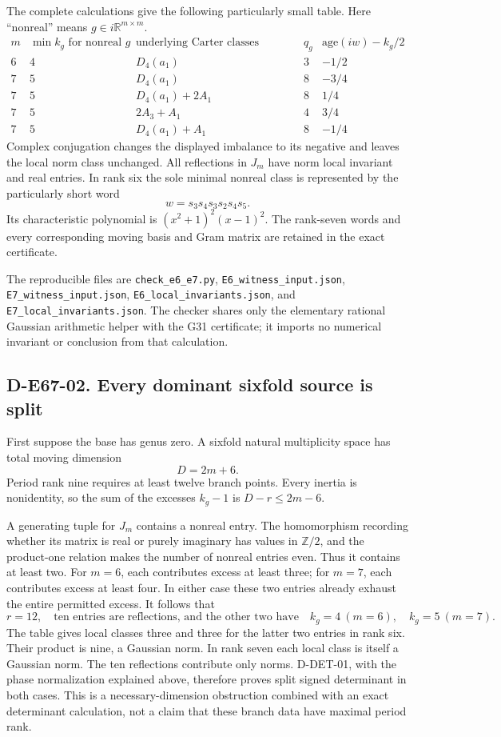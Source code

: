 The complete calculations give the following particularly small table.
Here ``nonreal'' means \(g\in i\mathbb R^{m\times m}\).
\[
\begin{array}{c|c|c|c|c}
m&\min k_g\text{ for nonreal }g&
 \text{underlying Carter classes attaining it}&q_g&
 \text{age}(iw)-k_g/2\\\hline
6&4&D_4(a_1)&3&-1/2\\
7&5&D_4(a_1)&8&-3/4\\
7&5&D_4(a_1)+2A_1&8&1/4\\
7&5&2A_3+A_1&4&3/4\\
7&5&D_4(a_1)+A_1&8&-1/4
\end{array}
\]
Complex conjugation changes the displayed imbalance to its negative
and leaves the local norm class unchanged. All reflections in \(J_m\)
have norm local invariant and real entries. In rank six the sole
minimal nonreal class is represented by the particularly short word
\[
                  w=s_3s_4s_3s_2s_4s_5.
\]
Its characteristic polynomial is \((x^2+1)^2(x-1)^2\).
The rank-seven words and every corresponding moving basis and Gram
matrix are retained in the exact certificate.

The reproducible files are \texttt{check\_e6\_e7.py},
\texttt{E6\_witness\_input.json}, \texttt{E7\_witness\_input.json},
\texttt{E6\_local\_invariants.json}, and
\texttt{E7\_local\_invariants.json}. The checker shares only the
elementary rational Gaussian arithmetic helper with the G31 certificate;
it imports no numerical invariant or conclusion from that calculation.

\subsection*{D-E67-02. Every dominant sixfold source is split}

First suppose the base has genus zero. A sixfold natural multiplicity
space has total moving dimension
\[
                              D=2m+6.
\]
Period rank nine requires at least twelve branch points. Every inertia
is nonidentity, so the sum of the excesses \(k_g-1\) is
\(D-r\le2m-6\).

A generating tuple for \(J_m\) contains a nonreal entry. The
homomorphism recording whether its matrix is real or purely imaginary
has values in \(\mathbb Z/2\), and the product-one relation makes
the number of nonreal entries even. Thus it contains at least two.
For \(m=6\), each contributes excess at least three; for \(m=7\),
each contributes excess at least four. In either case these two entries
already exhaust the entire permitted excess. It follows that
\[
 r=12,\quad\text{ten entries are reflections, and the other two have}
 \quad k_g=4\ (m=6),\quad k_g=5\ (m=7).
\]
The table gives local classes three and three for the latter two entries
in rank six. Their product is nine, a Gaussian norm. In rank seven each
local class is itself a Gaussian norm. The ten reflections contribute
only norms. D-DET-01, with the phase normalization explained above,
therefore proves split signed determinant in both cases. This is a
necessary-dimension obstruction combined with an exact determinant
calculation, not a claim that these branch data have maximal period rank.

